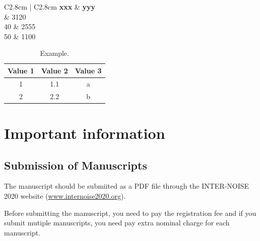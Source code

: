 \begin{table}[H]
  \centering 
  \caption{Example of table.}
	\fontsize{11}{12}\selectfont 
    \begin{tabular}{C{2.8cm} | C{2.8cm}}
    \toprule
    \textbf{ xxx } & \textbf{yyy} \\
	   & 3120\\
		 40	& 2555\\
		50 & 1100\\
    \bottomrule
    \end{tabular}
    \label{tab:table1}
\end{table}%

\begin{table}[h!]
  \begin{center}
    \caption{Example.}  
    \label{tab:table2}
    \begin{tabular}{c c c} 
     \hline	
      \textbf{Value 1} & \textbf{Value 2} & \textbf{Value 3}\\
      \hline
      1 & 1.1 & a\\
      \hline	
      2 & 2.2 & b\\
      \hline	
    \end{tabular}
  \end{center}
\end{table}


\section{Important information}


\subsection{Submission of Manuscripts}

The manuscript should be submiited as a PDF file through the INTER-NOISE 2020 website
(\url{www.internoise2020.org}). \par
Before submitting the manuscript, you need to pay the registration fee and if you submit mutiple manuscripts, you need pay extra nominal charge for each manuscript.

